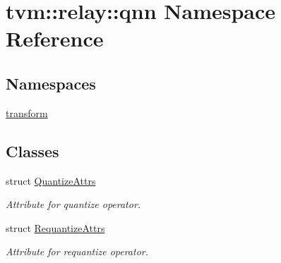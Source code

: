 \hypertarget{namespacetvm_1_1relay_1_1qnn}{}\section{tvm\+:\+:relay\+:\+:qnn Namespace Reference}
\label{namespacetvm_1_1relay_1_1qnn}
\subsection*{Namespaces}
\begin{DoxyCompactItemize}
\item 
 \hyperlink{namespacetvm_1_1relay_1_1qnn_1_1transform}{transform}
\end{DoxyCompactItemize}
\subsection*{Classes}
\begin{DoxyCompactItemize}
\item 
struct \hyperlink{structtvm_1_1relay_1_1qnn_1_1QuantizeAttrs}{Quantize\+Attrs}
\begin{DoxyCompactList}\small\item\em Attribute for quantize operator. \end{DoxyCompactList}\item 
struct \hyperlink{structtvm_1_1relay_1_1qnn_1_1RequantizeAttrs}{Requantize\+Attrs}
\begin{DoxyCompactList}\small\item\em Attribute for requantize operator. \end{DoxyCompactList}\end{DoxyCompactItemize}
